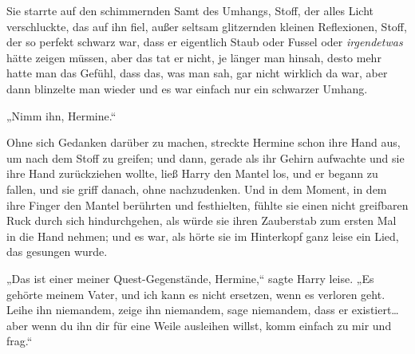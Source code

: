 Sie starrte auf den schimmernden Samt des Umhangs, Stoff, der alles Licht verschluckte, das auf ihn fiel, außer seltsam glitzernden kleinen Reflexionen, Stoff, der so perfekt schwarz war, dass er eigentlich Staub oder Fussel oder \emph{irgendetwas} hätte zeigen müssen, aber das tat er nicht, je länger man hinsah, desto mehr hatte man das Gefühl, dass das, was man sah, gar nicht wirklich da war, aber dann blinzelte man wieder und es war einfach nur ein schwarzer Umhang.

„Nimm ihn, Hermine.“

Ohne sich Gedanken darüber zu machen, streckte Hermine schon ihre Hand aus, um nach dem Stoff zu greifen; und dann, gerade als ihr Gehirn aufwachte und sie ihre Hand zurückziehen wollte, ließ Harry den Mantel los, und er begann zu fallen, und sie griff danach, ohne nachzudenken. Und in dem Moment, in dem ihre Finger den Mantel berührten und festhielten, fühlte sie einen nicht greifbaren Ruck durch sich hindurchgehen, als würde sie ihren Zauberstab zum ersten Mal in die Hand nehmen; und es war, als hörte sie im Hinterkopf ganz leise ein Lied, das gesungen wurde.

„Das ist einer meiner Quest-Gegenstände, Hermine,“ sagte Harry leise. „Es gehörte meinem Vater, und ich kann es nicht ersetzen, wenn es verloren geht. Leihe ihn niemandem, zeige ihn niemandem, sage niemandem, dass er existiert…aber wenn du ihn dir für eine Weile ausleihen willst, komm einfach zu mir und frag.“

